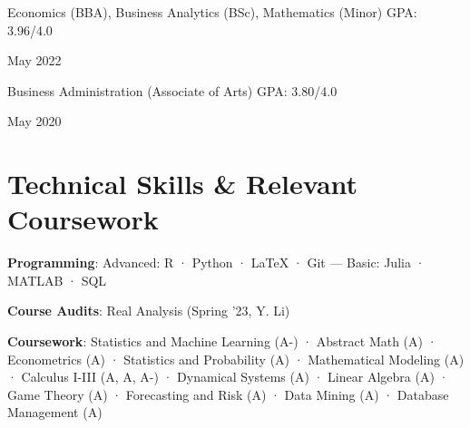 \documentclass[a4paper,20pt]{article}
\begin{document}
    	\begin{minipage}{.75\linewidth} \begin{flushleft}
    		Economics (BBA), Business Analytics (BSc), Mathematics (Minor) GPA: 3.96/4.0\\
    	\end{flushleft} \end{minipage}
    \hfill 
    \begin{minipage}{.20\linewidth}\begin{flushright}
    	 May 2022
    	\end{flushright}\end{minipage} 
	 
   		\begin{minipage}{.85\linewidth} \begin{flushleft}
    		Business Administration (Associate of Arts) GPA: 3.80/4.0\\
    	\end{flushleft} \end{minipage}
    \hfill 
    \begin{minipage}{.13\linewidth}\begin{flushright}
    	 May 2020
    	\end{flushright}\end{minipage}

\vspace{0pt}

\printbibliography[title={Publications}, type=article, resetnumbers=true]

\printbibliography[title={Software Packages \& Working Papers}, type=inproceedings, resetnumbers=true]

\vspace{-5pt}
\section{Technical Skills \& Relevant Coursework}
\vspace{5pt}
     \begin{description}[font=$\bullet$]
     \vspace{-5pt}
\item{\textbf{Programming}: Advanced: R · Python · \LaTeX{} · Git --- Basic: Julia · MATLAB · SQL}
     \vspace{-7pt}
\item{\textbf{Course Audits}: Real Analysis (Spring '23, Y. Li)}
     \vspace{-7pt}
\item{\textbf{Coursework}: Statistics and Machine Learning (A-) · Abstract Math (A) · Econometrics (A) · Statistics and Probability (A) · Mathematical Modeling (A) · Calculus I-III (A, A, A-) · Dynamical Systems (A) · Linear Algebra (A) · Game Theory (A) · Forecasting and Risk (A) · Data Mining (A) · Database Management (A)}
    \end{description}
    
\end{document}
